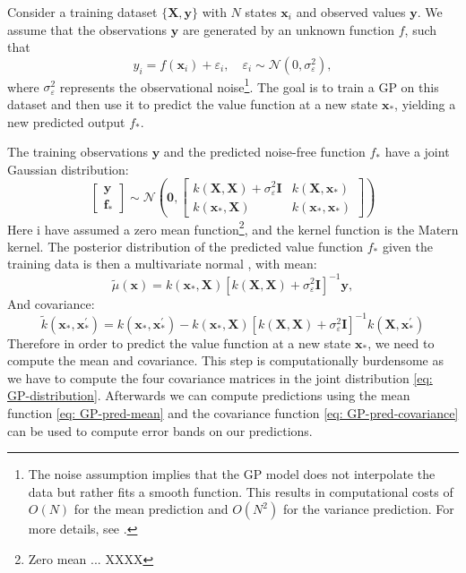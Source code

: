 \documentclass[11pt]{article}
\begin{document}
Consider a training dataset \( \{ \mathbf{X}, \mathbf{y} \} \)
with \( N \) states \( \mathbf{x}_{i} \) and observed values \( \mathbf{y} \). 
We assume that the observations \( \mathbf{y} \) are generated by an unknown function \( f \), such that
\[
y_i = f(\mathbf{x}_i) + \varepsilon_{i}, \quad \varepsilon_{i} \sim \mathcal{N}(0, \sigma^{2}_{\varepsilon}),
\]
where \( \sigma^{2}_{\varepsilon} \) represents the observational noise\footnote{The noise assumption implies that the GP model does not interpolate the data but rather fits a smooth function. 
This results in computational costs of \( O(N) \) for the mean prediction and \( O(N^2) \) for the variance prediction. For more details, see \autocite{MurphyBook2023}.}.
The goal is to train a \ac{GP} on this dataset and then use it to predict the value function at a new state \( \mathbf{x}_{*} \),
yielding a new predicted output \( f_{*} \).

The training observations \( \mathbf{y} \) and the predicted noise-free function \( f_{*} \) 
have a joint Gaussian distribution:
\begin{equation}\label{eq: GP-distribution}
  \begin{bmatrix}
    \mathbf{y} \\
    \mathbf{f}_{*}
  \end{bmatrix}
  \sim 
  \mathcal{N} \left( \mathbf{0},
                \begin{bmatrix}
                  k(\mathbf{X}, \mathbf{X}) + \sigma^{2}_{\varepsilon} \mathbf{I} & k(\mathbf{X}, \mathbf{x}_{*}) \\
                  k(\mathbf{x}_{*}, \mathbf{X}) & k(\mathbf{x}_{*}, \mathbf{x}_{*})
                \end{bmatrix}
              \right)
\end{equation}
Here i have assumed a zero mean function\footnote{Zero mean ... XXXX}, and the kernel function is the Matern kernel.
The posterior distribution of the predicted value function \( f_{*} \) given the training data is then a multivariate normal \autocite{MurphyBook2023},
with mean:
\begin{equation} \label{eq: GP-pred-mean}
  \tilde{\mu}(\mathbf{x}) = k(\mathbf{x}_{*}, \mathbf{X}) [k(\mathbf{X}, \mathbf{X}) + \sigma^{2}_{\varepsilon} \mathbf{I}]^{-1} \mathbf{y},
\end{equation}
And covariance:
\begin{equation} \label{eq: GP-pred-covariance}
 \tilde{k} (\mathbf{x}_* , \mathbf{x}_{*}^{'}) = 
 k (\mathbf{x}_* , \mathbf{x}_{*}^{'}) - 
 k (\mathbf{x}_* , \mathbf{X}) 
  [k (\mathbf{X} , \mathbf{X}) + \sigma^{2}_{\varepsilon} \mathbf{I}]^{-1}
  k (\mathbf{X} , \mathbf{x}_{*}^{'})
\end{equation}
Therefore in order to predict the value function at a new state $\mathbf{x}_{*}$, we need to compute the mean and covariance.
This step is computationally burdensome as we have to compute the four covariance matrices in the joint distribution \eqref{eq: GP-distribution}.
Afterwards we can compute predictions using the mean function \eqref{eq: GP-pred-mean} and the covariance function \eqref{eq: GP-pred-covariance}
can be used to compute error bands on our predictions. 
\end{document}
